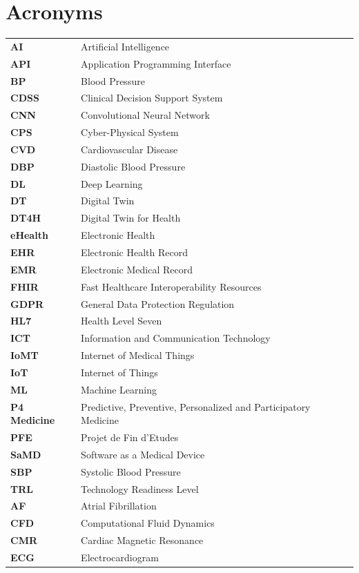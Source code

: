 \chapter*{Acronyms}

\scriptsize
\renewcommand{\arraystretch}{0.92}
\begin{tabularx}{\textwidth}{>{\bfseries}l X}
AI & Artificial Intelligence \\
API & Application Programming Interface \\
BP & Blood Pressure \\
CDSS & Clinical Decision Support System \\
CNN & Convolutional Neural Network \\
CPS & Cyber-Physical System \\
CVD & Cardiovascular Disease \\
DBP & Diastolic Blood Pressure \\
DL & Deep Learning \\
DT & Digital Twin \\
DT4H & Digital Twin for Health \\
eHealth & Electronic Health \\
EHR & Electronic Health Record \\
EMR & Electronic Medical Record \\
FHIR & Fast Healthcare Interoperability Resources \\
GDPR & General Data Protection Regulation \\
HL7 & Health Level Seven \\
ICT & Information and Communication Technology \\
IoMT & Internet of Medical Things \\
IoT & Internet of Things \\
ML & Machine Learning \\
P4 Medicine & Predictive, Preventive, Personalized and Participatory Medicine \\
PFE & Projet de Fin d'Etudes \\
SaMD & Software as a Medical Device \\
SBP & Systolic Blood Pressure \\
TRL & Technology Readiness Level \\
AF & Atrial Fibrillation \\
CFD & Computational Fluid Dynamics \\
CMR & Cardiac Magnetic Resonance \\
ECG & Electrocardiogram \\

\end{tabularx}
